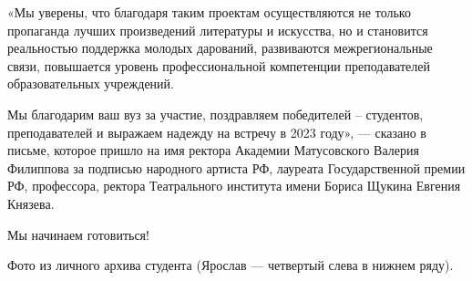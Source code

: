 «Мы уверены, что благодаря таким проектам осуществляются не только пропаганда
лучших произведений литературы и искусства, но и становится реальностью
поддержка молодых дарований, развиваются межрегиональные связи, повышается
уровень профессиональной компетенции преподавателей образовательных учреждений.

Мы благодарим ваш вуз за участие, поздравляем победителей – студентов,
преподавателей и выражаем надежду на встречу в 2023 году», — сказано в письме,
которое пришло на имя ректора Академии Матусовского Валерия Филиппова за
подписью народного артиста РФ, лауреата Государственной премии РФ, профессора,
ректора Театрального института имени Бориса Щукина Евгения Князева.

Мы начинаем готовиться!

 

Фото из личного архива студента (Ярослав — четвертый слева в нижнем ряду).
